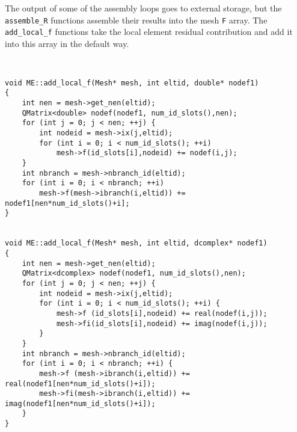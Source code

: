 The output of some of the assembly loops goes to external storage,
but the {\tt assemble\_R} functions assemble their results into the
mesh {\tt F} array.  The {\tt add\_local\_f} functions take the
local element residual contribution and add it into this array in
the default way.

\begin{verbatim}


void ME::add_local_f(Mesh* mesh, int eltid, double* nodef1)
{
    int nen = mesh->get_nen(eltid);
    QMatrix<double> nodef(nodef1, num_id_slots(),nen);
    for (int j = 0; j < nen; ++j) {
        int nodeid = mesh->ix(j,eltid);
        for (int i = 0; i < num_id_slots(); ++i)
            mesh->f(id_slots[i],nodeid) += nodef(i,j);
    }
    int nbranch = mesh->nbranch_id(eltid);
    for (int i = 0; i < nbranch; ++i)
        mesh->f(mesh->ibranch(i,eltid)) += nodef1[nen*num_id_slots()+i];
}


void ME::add_local_f(Mesh* mesh, int eltid, dcomplex* nodef1)
{
    int nen = mesh->get_nen(eltid);
    QMatrix<dcomplex> nodef(nodef1, num_id_slots(),nen);
    for (int j = 0; j < nen; ++j) {
        int nodeid = mesh->ix(j,eltid);
        for (int i = 0; i < num_id_slots(); ++i) {
            mesh->f (id_slots[i],nodeid) += real(nodef(i,j));
            mesh->fi(id_slots[i],nodeid) += imag(nodef(i,j));
        }
    }
    int nbranch = mesh->nbranch_id(eltid);
    for (int i = 0; i < nbranch; ++i) {
        mesh->f (mesh->ibranch(i,eltid)) += real(nodef1[nen*num_id_slots()+i]);
        mesh->fi(mesh->ibranch(i,eltid)) += imag(nodef1[nen*num_id_slots()+i]);
    }
}
\end{verbatim}
